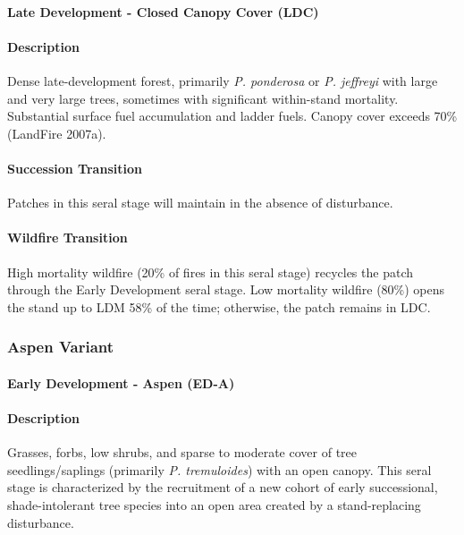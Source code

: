 \paragraph{Late Development - Closed Canopy Cover (LDC)}

\paragraph{Description} Dense late-development forest, primarily \emph{P. ponderosa} or \emph{P. jeffreyi} with large and very large trees, sometimes with significant within-stand mortality. Substantial surface fuel accumulation and ladder fuels. Canopy cover exceeds 70\% (LandFire 2007a).

\paragraph{Succession Transition} Patches in this seral stage will maintain in the absence of disturbance.

\paragraph{Wildfire Transition} High mortality wildfire (20\% of fires in this seral stage) recycles the patch through the Early Development seral stage. Low mortality wildfire (80\%) opens the stand up to LDM 58\% of the time; otherwise, the patch remains in LDC.

\noindent\hrulefill
\noindent\hrulefill

\subsubsection{Aspen Variant}

\paragraph{Early Development - Aspen (ED-A)}

\paragraph{Description} Grasses, forbs, low shrubs, and sparse to moderate cover of tree seedlings/saplings (primarily \emph{P. tremuloides}) with an open canopy. This seral stage is characterized by the recruitment of a new cohort of early successional, shade-intolerant tree species into an open area created by a stand-replacing disturbance. 

